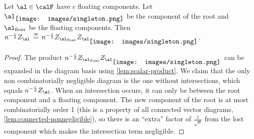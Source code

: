 \documentclass[12pt]{article}
\newcommand{\smallrootpic}{\vcenter{\hbox{\texttt{[image: images/singleton.png]}}}}
\newcommand{\eqinf}{\,\overset{\infty}{=}\,}
\begin{document}
\begin{lemma}\label{lem:scalar-to-vector}
    Let $\al \in \calF$ have $c$ floating components.
    Let $\al_{\smallrootpic}$ be the component of the root
    and $\al_{\textnormal{float}}$ be the floating components. Then
    $n^{- \frac c 2}Z_\al \eqinf n^{- \frac c 2} Z_{\al_{\textnormal{float}}}Z_{\al_{\smallrootpic}}$.
\end{lemma}
\begin{proof}
    The product $n^{-\frac c 2}Z_{\al_{\textnormal{float}}}Z_{\al_{\smallrootpic}}$ can be expanded
    in the diagram basis using \cref{lem:scalar-product}.
    We claim that the only non combinatorially negligible diagram
    is the one without intersections, which equals $n^{-\frac c 2}Z_\al$.
    When an intersection occurs, it can only be between the root component and a floating component.
    The new component of the root is at most combinatorially order 1
    (this is a property of all connected vector diagrams, \cref{lem:connected-nonnegligible}),
    so there is an 
    ``extra'' factor of $\frac{1}{\sqrt{n}}$ from the lost component which makes the intersection term negligible.
\end{proof}
\end{document}
